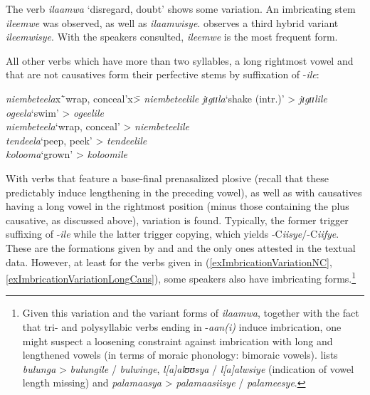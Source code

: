 The verb \textit{ilaamwa} \lq disregard, doubt' shows some variation. An imbricating stem \textit{ileemwe} was observed, as well as \textit{ilaamwisye}. \citet{BergerP1938} observes a third hybrid variant \textit{ileemwisye}. With the speakers consulted, \textit{ileemwe} is the most frequent form.

All other verbs which have more than two syllables, a long rightmost vowel and that are not causatives form their perfective stems by suffixation of -\textit{ile}: %
\begin{exe}
\ex \label{exLongVowelNoImbrication}
\begin{tabbing}
\textit{niembeteela}x\=`wrap, conceal'x\= > \textit{niembeteelile}\kill
\textit{jɪgɪɪla}\>`shake (intr.)'\> > \textit{jɪgɪɪlile}\\
\textit{ogeela}\>`swim'\> > \textit{ogeelile}\\
\textit{niembeteela}\>`wrap, conceal'\> > \textit{niembeteelile}\\
\textit{tendeela}\>`peep, peek'\> > \textit{tendeelile}\\
\textit{kolooma}\>`grown'\> > \textit{koloomile}
\end{tabbing}
\end{exe}

With verbs that feature a base-final prenasalized plosive (recall that these predictably induce lengthening in the preceding vowel), as well as with causatives having a long vowel in the rightmost position (minus those containing the  plus causative, as discussed above), variation is found. Typically, the former trigger suffixing of -\textit{ile} while the latter trigger copying, which yields \mbox{-C\textit{iisye}/}\mbox{-C\textit{iifye}}. These are the formations given by \citet{SchumannK1899} and \citet{BergerP1938} and the only ones attested in the textual data. However, at least for the verbs given in (\ref{exImbricationVariationNC}, \ref{exImbricationVariationLongCaus}), some speakers also have imbricating forms.\footnote{Given this variation and the variant forms of \textit{ilaamwa}, together with the fact that tri- and polysyllabic verbs ending in -\textit{aan(i)} induce imbrication, one might suspect a loosening constraint against imbrication with long and lengthened vowels (in terms of moraic phonology: bimoraic vowels). \citet{FelbergK1996} lists \textit{bulunga} > \textit{bulungile} / \textit{bulwinge}, \textit{l[a]alʊʊsya} / \textit{l[a]alwsiye} (indication of vowel length missing) and  \textit{palamaasya} > \textit{palamaasiisye} / \textit{palameesye}.}

